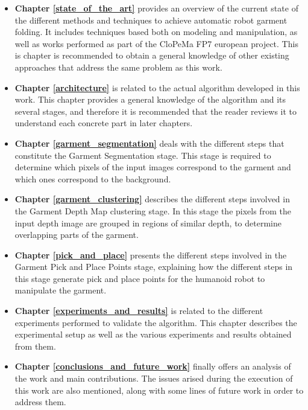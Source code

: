 \begin{itemize}
\item \textbf{Chapter \ref{state_of_the_art}} provides an overview of the current state of the different methods and techniques to achieve automatic robot garment folding. It includes techniques based both on modeling and manipulation, as well as works performed as part of the CloPeMa FP7 european project. This is chapter is recommended to obtain a general knowledge of other existing approaches that address the same problem as this work.
\item \textbf{Chapter \ref{architecture}} is related to the actual algorithm developed in this work. This chapter provides a general knowledge of the algorithm and its several stages, and therefore it is recommended that the reader reviews it to understand each concrete part in later chapters.
\item \textbf{Chapter \ref{garment_segmentation}} deals with the different steps that constitute the Garment Segmentation stage. This stage is required to determine which pixels of the input images correspond to the garment and which ones correspond to the background.
\item \textbf{Chapter \ref{garment_clustering}} describes the different steps involved in the Garment Depth Map clustering stage. In this stage the pixels from the input depth image are grouped in regions of similar depth, to determine overlapping parts of the garment.
\item \textbf{Chapter \ref{pick_and_place}} presents the different steps involved in the Garment Pick and Place Points stage, explaining how the different steps in this stage generate pick and place points for the humanoid robot to manipulate the garment.
\item \textbf{Chapter \ref{experiments_and_results}} is related to the different experiments performed to validate the algorithm. This chapter describes the experimental setup as well as the various experiments and results obtained from them.
\item \textbf{Chapter \ref{conclusions_and_future_work}} finally offers an analysis of the work and main contributions. The issues arised during the execution of this work are also mentioned, along with some lines of future work in order to address them.
\end{itemize}
